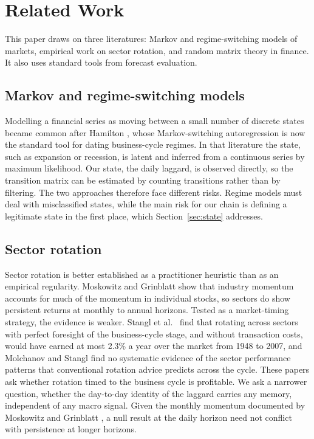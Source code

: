 \documentclass[11pt]{article}
\begin{document}
\clearpage
\section{Related Work}
\label{sec:related}

This paper draws on three literatures: Markov and regime-switching models of markets, empirical work on sector rotation, and random matrix theory in finance. It also uses standard tools from forecast evaluation.

\subsection{Markov and regime-switching models}

Modelling a financial series as moving between a small number of discrete states became common after Hamilton \cite{hamilton1989}, whose Markov-switching autoregression is now the standard tool for dating business-cycle regimes. In that literature the state, such as expansion or recession, is latent and inferred from a continuous series by maximum likelihood. Our state, the daily laggard, is observed directly, so the transition matrix can be estimated by counting transitions rather than by filtering. The two approaches therefore face different risks. Regime models must deal with misclassified states, while the main risk for our chain is defining a legitimate state in the first place, which Section~\ref{sec:state} addresses.

\subsection{Sector rotation}

Sector rotation is better established as a practitioner heuristic than as an empirical regularity. Moskowitz and Grinblatt \cite{moskowitzgrinblatt1999} show that industry momentum accounts for much of the momentum in individual stocks, so sectors do show persistent returns at monthly to annual horizons. Tested as a market-timing strategy, the evidence is weaker. Stangl et al.\ \cite{stangletal2009} find that rotating across sectors with perfect foresight of the business-cycle stage, and without transaction costs, would have earned at most 2.3\% a year over the market from 1948 to 2007, and Molchanov and Stangl \cite{molchanovstangl2024} find no systematic evidence of the sector performance patterns that conventional rotation advice predicts across the cycle. These papers ask whether rotation timed to the business cycle is profitable. We ask a narrower question, whether the day-to-day identity of the laggard carries any memory, independent of any macro signal. Given the monthly momentum documented by Moskowitz and Grinblatt \cite{moskowitzgrinblatt1999}, a null result at the daily horizon need not conflict with persistence at longer horizons.
\end{document}
